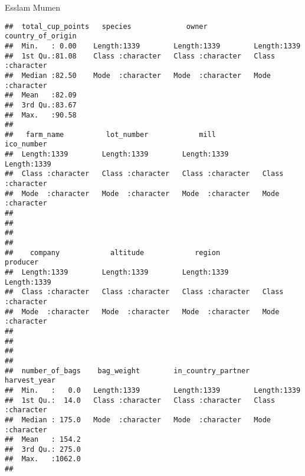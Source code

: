 \documentclass[
]{article}
\begin{document}
Esslam Mumen

\begin{verbatim}
##  total_cup_points   species             owner           country_of_origin 
##  Min.   : 0.00    Length:1339        Length:1339        Length:1339       
##  1st Qu.:81.08    Class :character   Class :character   Class :character  
##  Median :82.50    Mode  :character   Mode  :character   Mode  :character  
##  Mean   :82.09                                                            
##  3rd Qu.:83.67                                                            
##  Max.   :90.58                                                            
##                                                                           
##   farm_name          lot_number            mill            ico_number       
##  Length:1339        Length:1339        Length:1339        Length:1339       
##  Class :character   Class :character   Class :character   Class :character  
##  Mode  :character   Mode  :character   Mode  :character   Mode  :character  
##                                                                             
##                                                                             
##                                                                             
##                                                                             
##    company            altitude            region            producer        
##  Length:1339        Length:1339        Length:1339        Length:1339       
##  Class :character   Class :character   Class :character   Class :character  
##  Mode  :character   Mode  :character   Mode  :character   Mode  :character  
##                                                                             
##                                                                             
##                                                                             
##                                                                             
##  number_of_bags    bag_weight        in_country_partner harvest_year      
##  Min.   :   0.0   Length:1339        Length:1339        Length:1339       
##  1st Qu.:  14.0   Class :character   Class :character   Class :character  
##  Median : 175.0   Mode  :character   Mode  :character   Mode  :character  
##  Mean   : 154.2                                                           
##  3rd Qu.: 275.0                                                           
##  Max.   :1062.0                                                           
##                                                                           

\end{verbatim}
\end{document}
